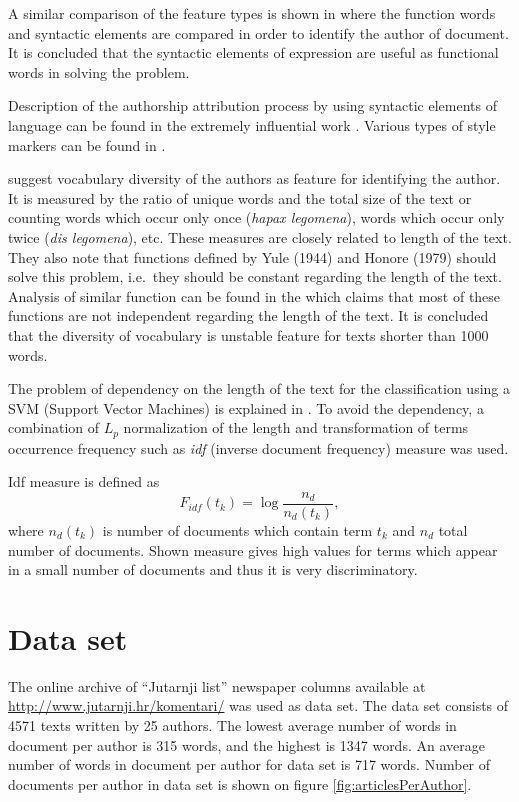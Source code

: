 \documentclass[11pt,english]{article}
\begin{document}
\begin{multicols}{2}
A similar comparison of the feature types is shown in
\citep{uzuner2005comparative} where the function words and syntactic
elements are compared in order to identify the author of document. It is
concluded that the syntactic elements of expression are useful as functional words in solving the
problem.

Description of the authorship attribution process by using syntactic elements
of language can be found in the extremely influential work
\citep{stamatatos2001computer}. Various types of style markers can be found in
\citep{diri2003automatic,luyckx2005shallow}.

\citet{stamatatos2001computer} suggest vocabulary diversity of the authors as
feature for identifying the author. It is measured by the ratio of unique words
and the total size of the text or counting words which occur only once
(\emph{hapax legomena}), words which occur only twice (\emph{dis legomena}), etc.
These measures are closely related to length of the text. They also note that
functions defined by Yule (1944) and Honore (1979) should solve this problem,
i.e.\ they should be constant regarding the length of the text. Analysis of
similar function can be found in the \citep{tweedie1998variable} which claims
that most of these functions are not independent regarding the length of the
text. It is concluded that the diversity of vocabulary is unstable feature for
texts shorter than 1000 words.

The problem of dependency on the length of the text for the classification using
a SVM (Support Vector Machines) is explained in \citep{diederich2003authorship}.
To avoid the dependency, a combination of $L_p$ normalization of the
length and transformation of terms occurrence frequency such as \emph{idf}
(inverse document frequency) measure was used.

Idf measure is defined as
\begin{equation}
F_{idf}(t_k) = \log \frac{n_d}{n_d(t_k)},
\label{equ:idf}
\end{equation}
where $n_d(t_k)$ is number of documents which contain term $t_k$ and $n_d$
total number of documents. Shown measure gives high values for terms which
appear in a small number of documents and thus it is very discriminatory.

\section{Data set}
\label{sec:podatci}
The online archive of ``Jutarnji list'' newspaper columns available at
\url{http://www.jutarnji.hr/komentari/} was used as data set. The data set
consists of 4571 texts written by 25 authors. The lowest average number of words
in document per author is 315 words, and the highest is 1347 words. An
average number of words in document per author for data set is 717 words. Number
of documents per author in data set is shown on figure
\ref{fig:articlesPerAuthor}.


\end{multicols}
\end{document}
